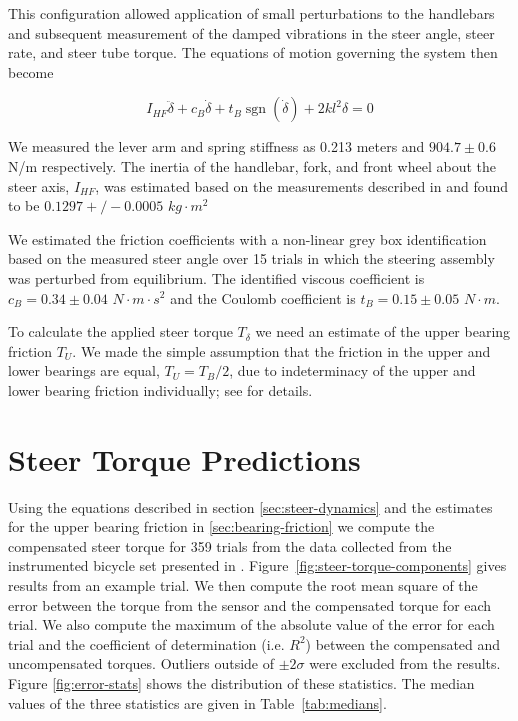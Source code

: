 \documentclass[10pt]{article}
\begin{document}
This configuration allowed application of small perturbations to the handlebars
and subsequent measurement of the damped vibrations in the steer angle, steer
rate, and steer tube torque. The equations of motion governing the system then
become

\begin{equation}
  I_{HF} \ddot{\delta} + c_B \dot{\delta} + t_B
  \operatorname{sgn}(\dot{\delta}) + 2 k l^2 \delta = 0
\end{equation}

We measured the lever arm and spring stiffness as 0.213 meters and $904.7 \pm
0.6$ N/m respectively. The inertia of the handlebar, fork, and front wheel
about the steer axis, $I_{HF}$, was estimated based on the measurements
described in \cite{Moore2012} and found to be $0.1297+/-0.0005$ $kg\cdot m^2$

We estimated the friction coefficients with a non-linear grey box
identification based on the measured steer angle over 15 trials in which the
steering assembly was perturbed from equilibrium. The identified viscous
coefficient is $c_B = 0.34 \pm 0.04$ $N \cdot m \cdot s^2$ and the Coulomb
coefficient is $t_B = 0.15 \pm 0.05$ $N \cdot m$.

To calculate the applied steer torque $T_\delta$ we need an estimate of the
upper bearing friction $T_U$. We made the simple assumption that the friction
in the upper and lower bearings are equal, $T_U = T_B / 2$, due to
indeterminacy of the upper and lower bearing friction individually; see
\cite{Moore2012} for details.

\section*{Steer Torque Predictions}

Using the equations described in section \ref{sec:steer-dynamics} and the
estimates for the upper bearing friction in \ref{sec:bearing-friction} we
compute the compensated steer torque for 359 trials from the data collected
from the instrumented bicycle set presented in \cite{Moore2012}.
Figure~\ref{fig:steer-torque-components} gives results from an example trial.
We then compute the root mean square of the error between the torque from the
sensor and the compensated torque for each trial. We also compute the maximum
of the absolute value of the error for each trial and the coefficient of
determination (i.e. $R^2$) between the compensated and uncompensated torques.
Outliers outside of $\pm2 \sigma$ were excluded from the results. Figure
\ref{fig:error-stats} shows the distribution of these statistics. The median
values of the three statistics are given in Table~\ref{tab:medians}.
\end{document}
